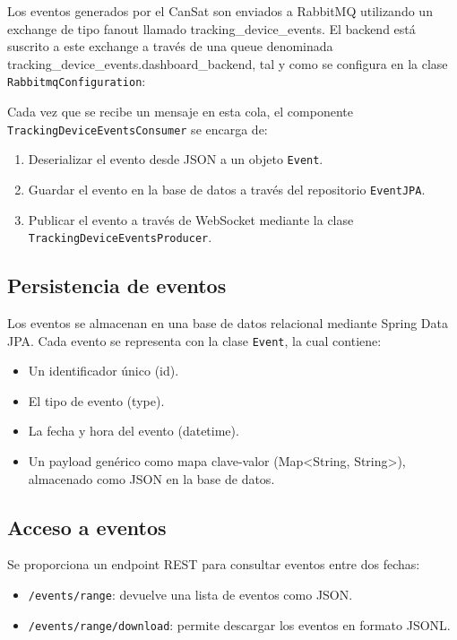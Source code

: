 Los eventos generados por el CanSat son enviados a RabbitMQ utilizando un exchange de tipo fanout llamado tracking\_device\_events.
El backend está suscrito a este exchange a través de una queue denominada tracking\_device\_events.dashboard\_backend, tal y como se configura en la clase \texttt{RabbitmqConfiguration}:

Cada vez que se recibe un mensaje en esta cola, el componente \texttt{TrackingDeviceEventsConsumer} se encarga de:
\begin{enumerate}
    \item Deserializar el evento desde JSON a un objeto \texttt{Event}.
    \item Guardar el evento en la base de datos a través del repositorio \texttt{EventJPA}.
    \item Publicar el evento a través de WebSocket mediante la clase \texttt{TrackingDeviceEventsProducer}.
\end{enumerate}

\subsection{Persistencia de eventos}

Los eventos se almacenan en una base de datos relacional mediante Spring Data JPA. Cada evento se representa con la clase \texttt{Event}, la cual contiene:
\begin{itemize}
    \item Un identificador único (id).
    \item El tipo de evento (type).
    \item La fecha y hora del evento (datetime).
    \item Un payload genérico como mapa clave-valor (Map<String, String>), almacenado como JSON en la base de datos.
\end{itemize}

\subsection{Acceso a eventos}

Se proporciona un endpoint REST para consultar eventos entre dos fechas:
\begin{itemize}
    \item \texttt{/events/range}: devuelve una lista de eventos como JSON.
    \item \texttt{/events/range/download}: permite descargar los eventos en formato JSONL.
\end{itemize}

